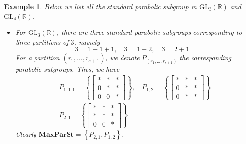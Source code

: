 \documentclass[12pt]{article} %
\newtheorem{example}[definition]{Example}
\begin{document}
\begin{example}
    Below we list all the standard parabolic subgroup in $\text{GL}_3(\mathbb{R})$ and $\text{GL}_4(\mathbb{R})$.
    \begin{itemize}
        \item For $\text{GL}_3(\mathbb{R})$, there are three standard parabolic subgroups corresponding to
              three partitions of $3$, namely
              \[ 3 = 1+ 1+ 1, \quad 3 =1+2 , \quad 3 = 2+1\]
              For a partition $(r_1,\ldots,r_{s+1})$, we denote $P_{(r_1,\ldots,r_{s+1})}$ the corresponding parabolic subgroups. Thus, we have
              \begin{align*}
                   & P_{1,1,1} = \left\lbrace \begin{bmatrix}
                                                  \ast & \ast & \ast \\
                                                  0    & \ast & \ast \\
                                                  0    & 0    & \ast
                                              \end{bmatrix}\right\rbrace, \quad P_{1,2} =\left\lbrace \begin{bmatrix}
                                                                                                          \ast & \ast & \ast \\
                                                                                                          0    & \ast & \ast \\
                                                                                                          0    & \ast & \ast
                                                                                                      \end{bmatrix}\right\rbrace \\
                   & P_{2,1} = \left\lbrace \begin{bmatrix}
                                                \ast & \ast & \ast \\
                                                \ast & \ast & \ast \\
                                                0    & 0    & \ast
                                            \end{bmatrix}\right\rbrace
              \end{align*}
              Clearly $\textbf{MaxParSt} = \left\lbrace P_{2,1}, P_{1,2}\right\rbrace$.

\end{itemize}
\end{example}
\end{document}
